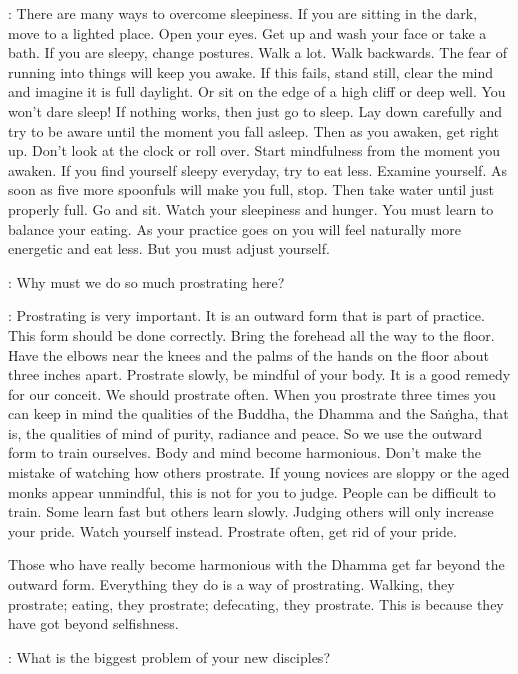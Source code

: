 : There are many ways to overcome sleepiness. If you are sitting in the dark, move to a lighted place. Open your eyes. Get up and wash your face or take a bath. If you are sleepy, change postures. Walk a lot. Walk backwards. The fear of running into things will keep you awake. If this fails, stand still, clear the mind and imagine it is full daylight. Or sit on the edge of a high cliff or deep well. You won't dare sleep! If nothing works, then just go to sleep. Lay down carefully and try to be aware until the moment you fall asleep. Then as you awaken, get right up. Don't look at the clock or roll over. Start mindfulness from the moment you awaken. If you find yourself sleepy everyday, try to eat less. Examine yourself. As soon as five more spoonfuls will make you full, stop. Then take water until just properly full. Go and sit. Watch your sleepiness and hunger. You must learn to balance your eating. As your practice goes on you will feel naturally more energetic and eat less. But you must adjust yourself. 

:
Why must we do so much prostrating here? 

: Prostrating is very important. It is an outward form that is part of practice. This form should be done correctly. Bring the forehead all the way to the floor. Have the elbows near the knees and the palms of the hands on the floor about three inches apart. Prostrate slowly, be mindful of your body. It is a good remedy for our conceit. We should prostrate often. When you prostrate three times you can keep in mind the qualities of the Buddha, the Dhamma and the Sa\.ngha, that is, the qualities of mind of purity, radiance and peace. So we use the outward form to train ourselves. Body and mind become harmonious. Don't make the mistake of watching how others prostrate. If young novices are sloppy or the aged monks appear unmindful, this is not for you to judge. People can be difficult to train. Some learn fast but others learn slowly. Judging others will only increase your pride. Watch yourself instead. Prostrate often, get rid of your pride. 

Those who have really become harmonious with the Dhamma get far beyond the outward form. Everything they do is a way of prostrating. Walking, they prostrate; eating, they prostrate; defecating, they prostrate. This is because they have got beyond selfishness. 

:
What is the biggest problem of your new disciples? 

